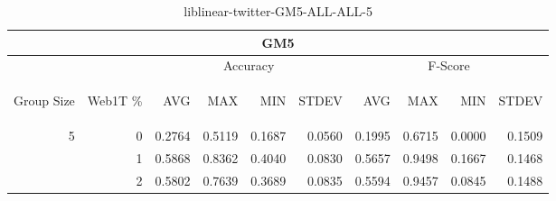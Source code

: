 \begin{center}
\begin{table}[htbp] 
 \begin{center}
\begin{tabular}{ | r | r | r | r | r | r | r | r | r | r |}
\hline
\multicolumn{10}{|c|}{GM5}\\
\hline
 & & \multicolumn{4}{|c|}{Accuracy} & \multicolumn{4}{|c|}{F-Score}\\ \cline{3-10}
\begin{sideways}Group Size\end{sideways} & \begin{sideways}Web1T \%\end{sideways} & \begin{sideways}AVG\end{sideways} & \begin{sideways}MAX\end{sideways} & \begin{sideways}MIN\end{sideways} & \begin{sideways}STDEV\end{sideways} & \begin{sideways}AVG\end{sideways} & \begin{sideways}MAX\end{sideways} & \begin{sideways}MIN\end{sideways} & \begin{sideways}STDEV\end{sideways}\\
\hline
\multirow{2}{*}{5}
 & 0 & 0.2764 & 0.5119 & 0.1687 & 0.0560 & 0.1995 & 0.6715 & 0.0000 & 0.1509\\ \cline{2-10}
 & 1 & 0.5868 & 0.8362 & 0.4040 & 0.0830 & 0.5657 & 0.9498 & 0.1667 & 0.1468\\ \cline{2-10}
 & 2 & 0.5802 & 0.7639 & 0.3689 & 0.0835 & 0.5594 & 0.9457 & 0.0845 & 0.1488\\ \cline{2-10}
\hline
\end{tabular}
\caption{liblinear-twitter-GM5-ALL-ALL-5}
\label{table:liblinear-twitter-GM5-ALL-ALL-5}
\end{center}
 \end{table}
\end{center}

